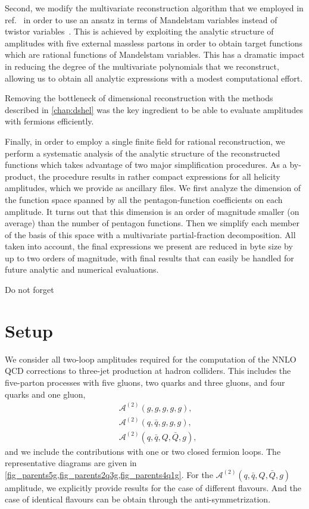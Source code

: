 Second, we modify the multivariate reconstruction algorithm that we employed
in ref.~\cite{Abreu:2018zmy} in order to use an ansatz in terms of Mandelstam variables
instead of twistor variables~\cite{Hodges:2009hk}. This is achieved by
exploiting the analytic structure of amplitudes with five external massless
partons in order to obtain target functions which are rational functions of
Mandelstam variables. This has a dramatic impact in reducing the degree of the
multivariate polynomials that we reconstruct, allowing us to obtain all
analytic expressions with a modest computational effort.

Removing the bottleneck of dimensional reconstruction with the methods described in \cref{chap:dshel} 
was the key ingredient to be able to evaluate amplitudes with fermions efficiently.


Finally, in order to employ a single finite field for rational
reconstruction, we perform a systematic analysis of the analytic structure of
the reconstructed functions which takes advantage of two major simplification
procedures. As a by-product, the procedure results in rather compact expressions
for all helicity amplitudes, which we provide as ancillary files. 
We first analyze the dimension of the function
space spanned by all the pentagon-function coefficients on each amplitude. It
turns out that this dimension is an order of magnitude smaller (on average)
than the number of pentagon functions. Then we simplify each member of the
basis of this space with a multivariate partial-fraction decomposition.  All
taken into account, the final expressions we present are reduced in byte size
by up to two orders of magnitude, with final results that can easily be handled
for future analytic and numerical evaluations.

Do not forget 


\section{Setup}
\label{5parton:sec:amplitudes}

We consider all
two-loop amplitudes required for the computation of the NNLO QCD corrections to three-jet production at
hadron colliders.
This includes the
five-parton processes with five gluons, two quarks and three gluons, and four
quarks and one gluon,  
\begin{align*}
  &\mathcal{A}^{(2)}(g,g,g,g,g), \\
  &\mathcal{A}^{(2)}(q,\bar{q},g,g,g), \\
  &\mathcal{A}^{(2)}(q,\bar{q},Q,\bar{Q},g),
\end{align*}
and we include the contributions with one or two closed fermion loops.
The representative diagrams are given in \cref{fig_parents5g,fig_parents2q3g,fig_parents4q1g}.
For the $\mathcal{A}^{(2)}(q,\bar{q},Q,\bar{Q},g)$ amplitude, we explicitly provide results for the case 
of different flavours. And the case of identical flavours can be obtain through the anti-symmetrization.

